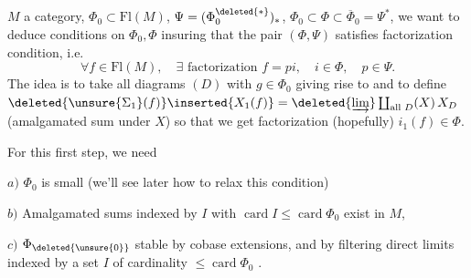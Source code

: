 
$M$ a category, $\Phi_0\subset\mathrm{Fl}(M)$, $\Psi=(\Phi_0^{\deleted{*}})_*$, $\Phi_0\subset\Phi\subset\overline\Phi_0=\Psi^*$, we want to deduce conditions on $\Phi_0,\Phi$ insuring that the pair $(\Phi,\Psi)$ satisfies factorization condition, i.e.
\[
\forall f\in\mathrm{Fl}(M),\quad\exists\text{ factorization }f=pi,\quad i\in\Phi,\quad p\in\Psi.
\]
The idea is to take  all diagrams
 $(D)$ with $g\in\Phi_0$
giving rise to
and to define $\deleted{\unsure{\Sigma_1}(f)}\inserted{X_1(f)}=\deleted{\varinjlim}\coprod_{\text{all }D}(X)\,X_D$ (amalgamated sum under $X$)
so that we get factorization
 (hopefully) $i_1(f)\in\Phi$.

For this first step, we need

$a)$ $\Phi_0$ is small (we'll see later how to relax this condition)

$b)$ Amalgamated sums indexed by $I$ with $\operatorname{card}I\leq\operatorname{card}\Phi_0$ exist in $M$, 

$c)$ $\Phi_{\deleted{\unsure{0}}}$ stable by  cobase extensions, and  by filtering direct limits  indexed by a set $I$ of cardinality $\leq\operatorname{card}\Phi_0$ .

